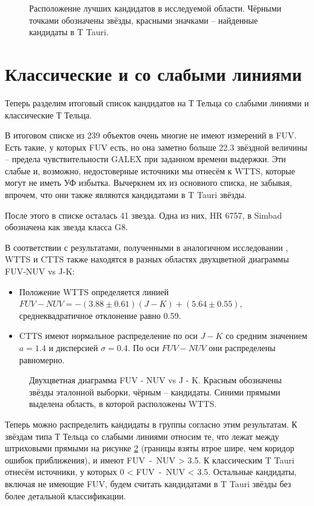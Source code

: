 \begin{figure}[ht]
\hfill
\caption{Расположение лучших кандидатов в исследуемой области. Чёрными точками обозначены звёзды, красными значками -- найденные кандидаты в T Tauri.}
\label{fig:pos}
\end{figure}


\section{Классические и со слабыми линиями}
Теперь разделим итоговый список кандидатов на Т Тельца со слабыми линиями и классические Т Тельца. 

В итоговом списке из 239 объектов очень многие не имеют измерений в FUV. Есть такие, у которых FUV есть, но она заметно больше 22.3 звёздной величины -- предела чувствительности GALEX при заданном времени выдержки. Эти слабые и, возможно, недостоверные источники мы отнесём к WTTS, которые могут не иметь УФ избытка. Вычеркнем их из основного списка, не забывая, впрочем, что они также являются кандидатами в T Tauri звёзды. 

После этого в списке осталась 41 звезда. Одна из них, HR 6757, в Simbad обозначена как звезда класса G8.

В соответствии с результатами, полученными в аналогичном исследовании \cite{AIGdC2014galex}, WTTS и CTTS также находятся в разных областях двухцветной диаграммы FUV-NUV vs J-K:
\begin{itemize}
	\item Положение WTTS определяется линией $FUV - NUV = -(3.88 \pm 0.61)(J - K) + (5.64 \pm 0.55)$, среднеквадратичное отклонение равно 0.59.
	\item CTTS имеют нормальное распределение по оси $J - K$ со средним значением $a = 1.4$ и дисперсией $\sigma = 0.4$. По оси $FUV - NUV$ они распределены равномерно.
\end{itemize}

\begin{figure}[ht]
\hfill
\caption{Двухцветная диаграмма FUV - NUV vs J - K. Красным обозначены звёзды эталонной выборки, чёрным -- кандидаты. Синими прямыми выделена область, в которой расположены WTTS.}
\label{fig:trend}
\end{figure}

Теперь можно распределить кандидаты в группы согласно этим результатам. К звёздам типа Т Тельца со слабыми линиями относим те, что лежат между штриховыми прямыми на рисунке \ref{fig:trend} (границы взяты втрое шире, чем коридор ошибок приближения), и имеют FUV~-~NUV > 3.5. К классическим T Tauri отнесём источники, у которых 0 < FUV~-~NUV < 3.5. Остальные кандидаты, включая не имеющие FUV, будем считать кандидатами в T Tauri звёзды без более детальной классификации.



